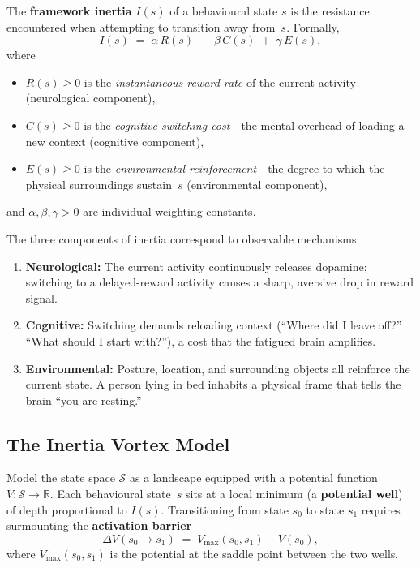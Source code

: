 \begin{definition}\label{def:inertia}
The \textbf{framework inertia} $I(s)$ of a behavioural state $s$ is the
resistance encountered when attempting to transition away from~$s$. Formally,
\[
  I(s) \;=\; \alpha \, R(s) \;+\; \beta \, C(s) \;+\; \gamma \, E(s),
\]
where
\begin{itemize}[nosep]
  \item $R(s) \geq 0$ is the \emph{instantaneous reward rate} of the current
        activity (neurological component),
  \item $C(s) \geq 0$ is the \emph{cognitive switching cost}---the mental
        overhead of loading a new context (cognitive component),
  \item $E(s) \geq 0$ is the \emph{environmental reinforcement}---the degree
        to which the physical surroundings sustain~$s$ (environmental
        component),
\end{itemize}
and $\alpha, \beta, \gamma > 0$ are individual weighting constants.
\end{definition}

\begin{remark}
The three components of inertia correspond to observable mechanisms:
\begin{enumerate}[nosep]
  \item \textbf{Neurological:} The current activity continuously releases
        dopamine; switching to a delayed-reward activity causes a sharp,
        aversive drop in reward signal.
  \item \textbf{Cognitive:} Switching demands reloading context (``Where did I
        leave off?'' ``What should I start with?''), a cost that the fatigued
        brain amplifies.
  \item \textbf{Environmental:} Posture, location, and surrounding objects
        all reinforce the current state. A person lying in bed inhabits a
        physical frame that tells the brain ``you are resting.''
\end{enumerate}
\end{remark}

\subsection{The Inertia Vortex Model}

\begin{definition}\label{def:potential-well}
Model the state space $\mathcal{S}$ as a landscape equipped with a potential
function $V : \mathcal{S} \to \mathbb{R}$. Each behavioural state~$s$ sits at
a local minimum (a \textbf{potential well}) of depth proportional to $I(s)$.
Transitioning from state $s_0$ to state $s_1$ requires surmounting the
\textbf{activation barrier}
\[
  \Delta V(s_0 \to s_1) \;=\; V_{\max}(s_0, s_1) - V(s_0),
\]
where $V_{\max}(s_0, s_1)$ is the potential at the saddle point between the
two wells.
\end{definition}

